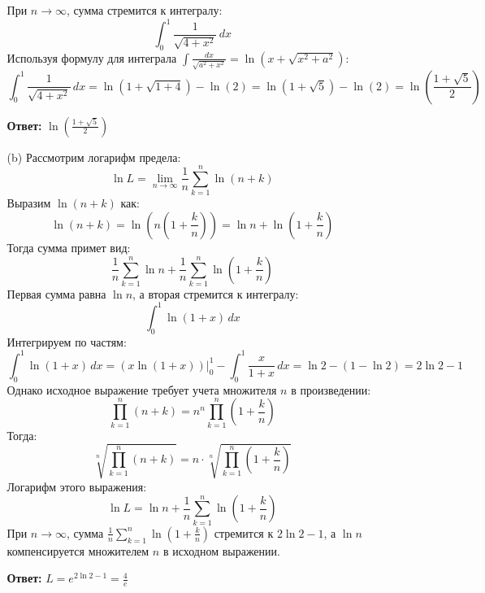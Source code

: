 \documentclass[a4paper]{article}
\begin{document}
\begin{enumerate}
\begin{enumerate}
        При \( n \to \infty \), сумма стремится к интегралу:  
        \[
        \int_{0}^{1} \frac{1}{\sqrt{4 + x^2}} \, dx
        \]  
        Используя формулу для интеграла \( \int \frac{dx}{\sqrt{a^2 + x^2}} = \ln(x + \sqrt{x^2 + a^2}) \):  
        \[
        \int_{0}^{1} \frac{1}{\sqrt{4 + x^2}} \, dx = \ln\left(1 + \sqrt{1 + 4}\right) - \ln(2) = \ln(1 + \sqrt{5}) - \ln(2) = \ln\left(\frac{1 + \sqrt{5}}{2}\right)
        \]
        
        \textbf{Ответ: } $\ln\left(\frac{1 + \sqrt{5}}{2}\right)$\\

        \item[(b)]Рассмотрим логарифм предела:  
        \[
        \ln L = \lim_{n \to \infty} \frac{1}{n} \sum_{k=1}^{n} \ln(n + k)
        \]  
        Выразим \( \ln(n + k) \) как:  
        \[
        \ln(n + k) = \ln\left(n \left(1 + \frac{k}{n}\right)\right) = \ln n + \ln\left(1 + \frac{k}{n}\right)
        \]  
        Тогда сумма примет вид:  
        \[
        \frac{1}{n} \sum_{k=1}^{n} \ln n + \frac{1}{n} \sum_{k=1}^{n} \ln\left(1 + \frac{k}{n}\right)
        \]  
        Первая сумма равна \( \ln n \), а вторая стремится к интегралу:  
        \[
        \int_{0}^{1} \ln(1 + x) \, dx
        \]  
        Интегрируем по частям:  
        \[
        \int_{0}^{1} \ln(1 + x) \, dx = (x \ln(1 + x))\bigg|_{0}^{1} - \int_{0}^{1} \frac{x}{1 + x} \, dx = \ln 2 - \left(1 - \ln 2\right) = 2 \ln 2 - 1
        \]  
        Однако исходное выражение требует учета множителя \( n \) в произведении:  
        \[
        \prod_{k=1}^{n} (n + k) = n^n \prod_{k=1}^{n} \left(1 + \frac{k}{n}\right)
        \]  
        Тогда:  
        \[
        \sqrt[n]{\prod_{k=1}^{n} (n + k)} = n \cdot \sqrt[n]{\prod_{k=1}^{n} \left(1 + \frac{k}{n}\right)}
        \]  
        Логарифм этого выражения:  
        \[
        \ln L = \ln n + \frac{1}{n} \sum_{k=1}^{n} \ln\left(1 + \frac{k}{n}\right)
        \]  
        При \( n \to \infty \), сумма \( \frac{1}{n} \sum_{k=1}^{n} \ln\left(1 + \frac{k}{n}\right) \) стремится к \( 2 \ln 2 - 1 \), а \( \ln n \) компенсируется множителем \( n \) в исходном выражении.  

        \textbf{Ответ: } $ L = e^{2 \ln 2 - 1} = \frac{4}{e} $\\
    \end{enumerate}


\end{enumerate}
\end{document}
